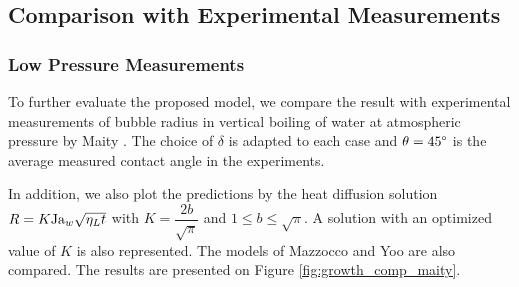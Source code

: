 \subsection{Comparison with Experimental Measurements}

\subsubsection{Low Pressure Measurements}
To further evaluate the proposed model, we compare the result with experimental measurements of bubble radius in vertical boiling of water at atmospheric pressure by Maity \cite{maity_effect_2000}. The choice of $\delta$ is adapted to each case and $\theta=45\degree$ is the average measured contact angle in the experiments.

In addition, we also plot the predictions by the heat diffusion solution $R=K\mathrm{Ja}_{w}\sqrt{\eta_{L}t}$ with $K=\dfrac{2b}{\sqrt{\pi}}$ and $1 \leq b \leq \sqrt{\pi}$. A solution with an optimized value of $K$ is also represented. The models of Mazzocco and Yoo \etal are also compared. The results are presented on Figure \ref{fig:growth_comp_maity}.

